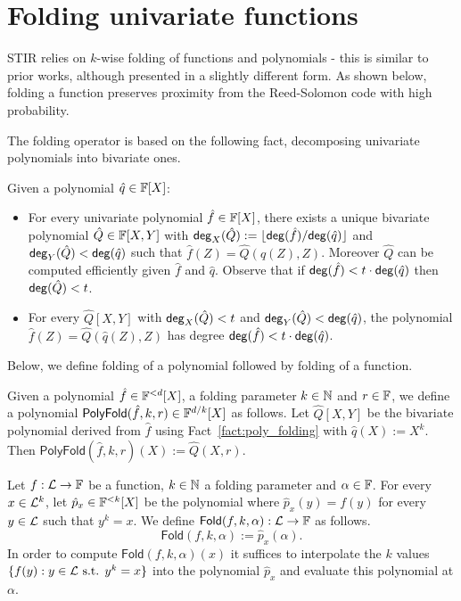 \section{Folding univariate functions}\label{sec:folding_uf}
STIR relies on $k$-wise folding of functions and polynomials - this is similar to prior works, although presented in a slightly different form. As shown below, folding a function preserves proximity from the Reed-Solomon code with high probability. 

The folding operator is based on the following fact, decomposing univariate polynomials into bivariate ones.

\begin{fact}\label{fact:poly_folding} %
Given a polynomial $\hat{q}\in\mathbb{F}[X]$:
\begin{itemize}
    \item For every univariate polynomial $\hat{f}\in\mathbb{F}[X]$, there exists a unique bivariate polynomial $\hat{Q}\in\mathbb{F}[X,Y]$ with $\mathsf{deg}_X(\hat{Q}):=\lfloor{\mathsf{deg}(\hat{f})}/{\mathsf{deg}(\hat{q})}\rfloor$ and $\mathsf{deg}_Y(\hat{Q})<\mathsf{deg}(\hat{q})$ such that $\hat{f}(Z)=\hat{Q}(\hat{q}(Z),Z)$. Moreover $\hat{Q}$ can be computed efficiently given $\hat{f}$ and $\hat{q}$. Observe that if $\mathsf{deg}(\hat{f})<t\cdot\mathsf{deg}(\hat{q})$ then $\mathsf{deg}(\hat{Q})<t$.
    \item For every $\hat{Q}[X,Y]$ with $\mathsf{deg}_X(\hat{Q})<t$ and $\mathsf{deg}_Y(\hat{Q})<\mathsf{deg}(\hat{q})$, the polynomial $\hat{f}(Z)=\hat{Q}(\hat{q}(Z),Z)$ has degree $\mathsf{deg}(\hat{f})<t\cdot\mathsf{deg}(\hat{q})$.
\end{itemize}
\end{fact}

Below, we define folding of a polynomial followed by folding of a function.
\begin{definition}
    Given a polynomial $\hat{f}\in\mathbb{F}^{<d}[X]$, a folding parameter $k\in\mathbb{N}$ and $r\in\mathbb{F}$, we define a polynomial $\mathsf{PolyFold}(\hat{f},k,r)\in\mathbb{F}^{d/k}[X]$ as follows. Let $\hat{Q}[X,Y]$ be the bivariate polynomial derived from $\hat{f}$ using Fact~\ref{fact:poly_folding} with $\hat{q}(X):=X^k$. Then $\mathsf{PolyFold}(\hat{f},k,r)(X):=\hat{Q}(X,r)$.
\end{definition}

\begin{definition}
Let $f:\mathcal{L}\rightarrow\mathbb{F}$ be a function, $k\in\mathbb{N}$ a folding parameter and $\alpha\in\mathbb{F}$. For every $x\in{\mathcal{L}}^k$, let $\hat{p}_x\in\mathbb{F}^{<k}[X]$ be the polynomial where $\hat{p}_x(y)=f(y)$ for every $y\in{\mathcal{L}}$ such that $y^k=x$. We define $\mathsf{Fold}(f,k,\alpha):\mathcal{L}\rightarrow\mathbb{F}$ as follows.
\[
    \mathsf{Fold}(f,k,\alpha):=\hat{p}_x(\alpha).
\]
In order to compute $\mathsf{Fold}(f,k,\alpha)(x)$ it suffices to interpolate the $k$ values $\{f(y):y\in\mathcal{L}\text{ s.t. }y^k=x\}$ into the polynomial $\hat{p}_x$ and evaluate this polynomial at $\alpha$.
\end{definition}

